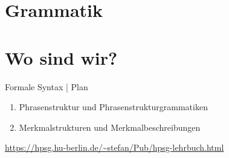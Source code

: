 \documentclass[handout,aspectratio=1610,dvipsnames]{beamer}
\begin{document}
  \section[Grammatik]{Grammatik}
  \let\woopsi\section\let\section\subsection\let\subsection\subsubsection
  
  \let\subsection\section\let\section\woopsi

  \section{Wo sind wir?}

  \begin{frame}
    {Formale Syntax | Plan}
    \begin{enumerate}
      \item Phrasenstruktur und Phrasenstrukturgrammatiken 
      \item Merkmalstrukturen und Merkmalbeschreibungen
    \end{enumerate}
    \Halbzeile
    \centering 
    \url{https://hpsg.hu-berlin.de/~stefan/Pub/hpsg-lehrbuch.html}
  \end{frame}
\fi


\makeatletter
\setcounter{lastpagemainpart}{\the\c@framenumber}
\makeatother
\end{document}

